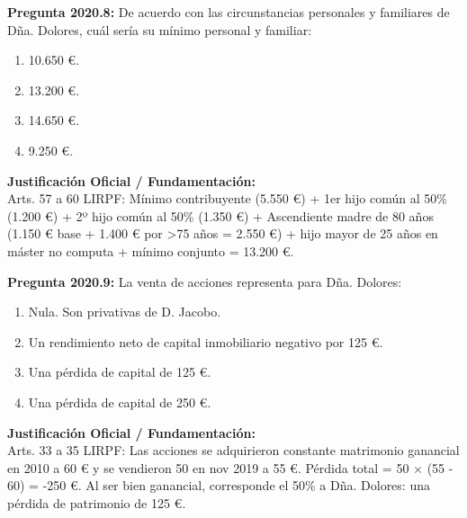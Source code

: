 \documentclass[11pt,a4paper,openany]{article}
\begin{document}
\noindent\textbf{\sffamily Pregunta 2020.8:} De acuerdo con las circunstancias personales y familiares de Dña. Dolores, cuál sería su mínimo personal y familiar:\\[0.15cm]
\begin{enumerate}[label=\textbf{\alph*)},leftmargin=1.8em,itemsep=1.5pt,topsep=2pt,partopsep=0pt,parsep=0pt]
    \item 10.650 \euro{}.
    \item 13.200 \euro{}.
    \item 14.650 \euro{}.
    \item 9.250 \euro{}.
\end{enumerate}
\begin{solucionBox}
\textbf{Justificación Oficial / Fundamentación:}\\[0.1cm]
Arts. 57 a 60 LIRPF: Mínimo contribuyente (5.550 \euro{}) + 1er hijo común al 50\% (1.200 \euro{}) + 2º hijo común al 50\% (1.350 \euro{}) + Ascendiente madre de 80 años (1.150 \euro{} base + 1.400 \euro{} por >75 años = 2.550 \euro{}) + hijo mayor de 25 años en máster no computa + mínimo conjunto = 13.200 \euro{}.
\end{solucionBox}
\vspace{0.35cm}

\noindent\textbf{\sffamily Pregunta 2020.9:} La venta de acciones representa para Dña. Dolores:\\[0.15cm]
\begin{enumerate}[label=\textbf{\alph*)},leftmargin=1.8em,itemsep=1.5pt,topsep=2pt,partopsep=0pt,parsep=0pt]
    \item Nula. Son privativas de D. Jacobo.
    \item Un rendimiento neto de capital inmobiliario negativo por 125 \euro{}.
    \item Una pérdida de capital de 125 \euro{}.
    \item Una pérdida de capital de 250 \euro{}.
\end{enumerate}
\begin{solucionBox}
\textbf{Justificación Oficial / Fundamentación:}\\[0.1cm]
Arts. 33 a 35 LIRPF: Las acciones se adquirieron constante matrimonio ganancial en 2010 a 60 \euro{} y se vendieron 50 en nov 2019 a 55 \euro{}. Pérdida total = 50 $\times$  (55 - 60) = -250 \euro{}. Al ser bien ganancial, corresponde el 50\% a Dña. Dolores: una pérdida de patrimonio de 125 \euro{}.
\end{solucionBox}
\vspace{0.35cm}
\end{document}
